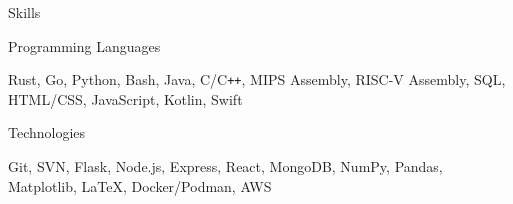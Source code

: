\documentclass{resume}
\begin{document}
\begin{rSection}{\large Skills}

\begin{rSubsection}{Programming Languages}{}{}{}
\item Rust, Go, Python, Bash, Java, C/C{}\verb!++!, MIPS Assembly, RISC-V Assembly, SQL, HTML/CSS, JavaScript, Kotlin, Swift 
\end{rSubsection}

\begin{rSubsection}{Technologies}{}{}{}
\item Git, SVN, Flask, Node.js, Express, React, MongoDB, NumPy, Pandas, Matplotlib, LaTeX, Docker/Podman, AWS
\end{rSubsection}

\end{rSection}
\end{document}
